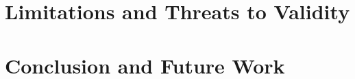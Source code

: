 \section{Limitations and Threats to Validity}
\label{sec:Limit}

\section{Conclusion and Future Work}
\label{sec:Conclusion}


%
%



%
%


